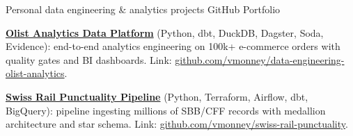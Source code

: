\begin{cventries}
  \cventry
    {Personal data engineering \& analytics projects}
    {GitHub Portfolio}
    {}
    {}
    {
      \begin{cvitems}
        \item {\href{https://github.com/vmonney/data-engineering-olist-analytics}{\textbf{Olist Analytics Data Platform}} (Python, dbt, DuckDB, Dagster, Soda, Evidence): end-to-end analytics engineering on 100k+ e-commerce orders with quality gates and BI dashboards. Link: \href{https://github.com/vmonney/data-engineering-olist-analytics}{\textcolor{awesome-red}{github.com/vmonney/data-engineering-olist-analytics}}.}
        \item {\href{https://github.com/vmonney/swiss-rail-punctuality}{\textbf{Swiss Rail Punctuality Pipeline}} (Python, Terraform, Airflow, dbt, BigQuery): pipeline ingesting millions of SBB/CFF records with medallion architecture and star schema. Link: \href{https://github.com/vmonney/swiss-rail-punctuality}{\textcolor{awesome-red}{github.com/vmonney/swiss-rail-punctuality}}.}
      \end{cvitems}
    }
\end{cventries}
